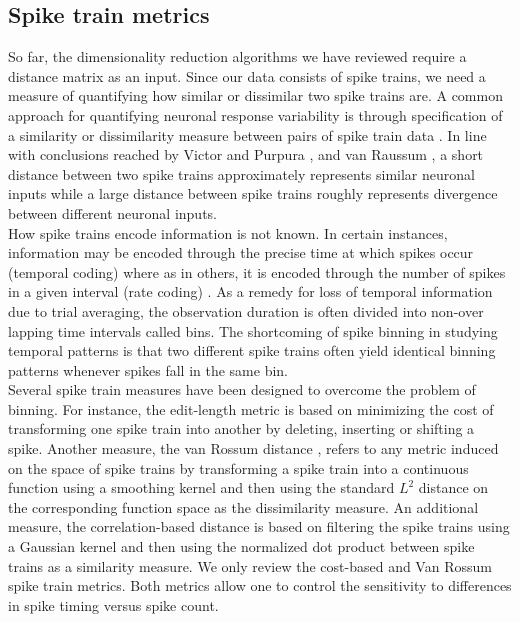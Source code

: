 
\subsection{Spike train metrics}
So far, the dimensionality reduction algorithms we have reviewed require a distance matrix
as an input. Since our data consists of spike trains, we need a measure of quantifying how 
similar or dissimilar two spike trains are.
A common approach for quantifying neuronal response variability is through specification of a  similarity or dissimilarity measure between pairs of spike train data \cite{Brown2004, Victor1996, Victor1998,Rossum2001,houghton2010measuring}. In line with conclusions reached by Victor and Purpura \cite{Victor1996, Victor1998}, and van Raussum \cite{Rossum2001}, a short distance between two spike trains approximately represents similar neuronal inputs while a large distance between spike trains roughly represents divergence between different neuronal inputs.\\

How spike trains encode information is not known. In certain instances, information may be encoded through the precise time at which spikes occur (temporal coding) where as in others, it is encoded through the number of spikes in a given interval (rate coding) \cite{Abbott2001}.
As a remedy for loss of temporal information due to trial averaging, the observation duration is often divided into non-over lapping time intervals called bins. The shortcoming of spike binning in studying temporal patterns is that two different spike trains often yield identical binning patterns whenever spikes fall in the same bin.\\

Several spike train measures have been designed to overcome the problem of binning. For instance, the edit-length metric \cite{Victor1996, Victor1998} is based on minimizing the cost of transforming one spike train into another by deleting, inserting or shifting a spike. Another measure, the van Rossum distance \cite{Rossum2001,houghton2010measuring}, refers to any metric induced on the space of spike trains by transforming a spike train into a continuous function using a smoothing kernel and then using the standard $L^2$ distance on the corresponding function space as the dissimilarity measure. An additional measure, the correlation-based distance \cite{Schreiber2003} is based on filtering the spike trains using a Gaussian kernel and then using the normalized dot product between  spike trains as a  similarity measure.
We only review the cost-based and Van Rossum spike train metrics. Both metrics allow one to control the sensitivity to differences in spike timing versus spike count.

